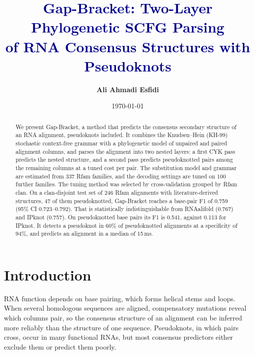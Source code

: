 \documentclass[10pt, twocolumn]{article}
\title{\textbf{\textcolor{DarkBlue}{Gap-Bracket: Two-Layer Phylogenetic SCFG Parsing\\of RNA Consensus Structures with Pseudoknots}}}
\author{\textbf{Ali Ahmadi Esfidi}}
\date{\today}
\newcommand{\GB}{Gap-Bracket}
\begin{document}
\maketitle

\begin{abstract}
We present \GB{}, a method that predicts the consensus secondary structure of an RNA alignment, pseudoknots included. It combines the Knudsen--Hein (KH-99) stochastic context-free grammar with a phylogenetic model of unpaired and paired alignment columns, and parses the alignment into two nested layers: a first CYK pass predicts the nested structure, and a second pass predicts pseudoknotted pairs among the remaining columns at a tuned cost per pair. The substitution model and grammar are estimated from 337 Rfam families, and the decoding settings are tuned on 100 further families. The tuning method was selected by cross-validation grouped by Rfam clan. On a clan-disjoint test set of 246 Rfam alignments with literature-derived structures, 47 of them pseudoknotted, \GB{} reaches a base-pair F1 of 0.759 (95\% CI 0.723--0.792). That is statistically indistinguishable from RNAalifold (0.767) and IPknot (0.757). On pseudoknotted base pairs its F1 is 0.541, against 0.113 for IPknot. It detects a pseudoknot in 60\% of pseudoknotted alignments at a specificity of 94\%, and predicts an alignment in a median of 15\,ms.
\end{abstract}

\section{Introduction}
RNA function depends on base pairing, which forms helical stems and loops. When several homologous sequences are aligned, compensatory mutations reveal which columns pair, so the consensus structure of an alignment can be inferred more reliably than the structure of one sequence. Pseudoknots, in which pairs cross, occur in many functional RNAs, but most consensus predictors either exclude them or predict them poorly.
\end{document}
